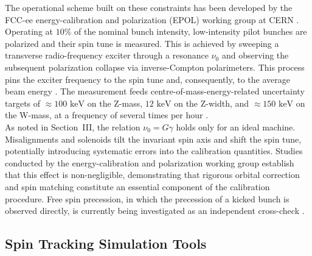 \documentclass[%
 aip,
 amsmath,amssymb,
 reprint,%
superscriptaddress
]{revtex4-2}
\begin{document}
The operational scheme built on these constraints has been developed by the FCC-ee energy-calibration and polarization (EPOL) working group at CERN \cite{blondel_polarization_2019,keintzel_wu_kiel_sagan_wilkinson_oide_bauche_hofle_blondel_jiang_2025,keintzel:ipac2026-mop1037}.
Operating at $10\%$ of the nominal bunch intensity, low-intensity pilot bunches are polarized and their spin tune is measured.
This is achieved by sweeping a transverse radio-frequency exciter through a resonance $\nu_0$ and observing the subsequent polarization collapse via inverse-Compton polarimeters.
This process pins the exciter frequency to the spin tune and, consequently, to the average beam energy \cite{blondel_polarization_2019,keintzel_wu_kiel_sagan_wilkinson_oide_bauche_hofle_blondel_jiang_2025}.
The measurement feeds centre-of-mass-energy-related uncertainty targets of $\approx 100\text{ keV}$ on the Z-mass, $12\text{ keV}$ on the Z-width, and $\approx 150\text{ keV}$ on the W-mass, at a frequency of several times per hour \cite{keintzel_wu_kiel_sagan_wilkinson_oide_bauche_hofle_blondel_jiang_2025,keintzel:ipac2026-mop1037}.
\\
As noted in Section~III, the relation $\nu_0 = G\gamma$ holds only for an ideal machine.
Misalignments and solenoids tilt the invariant spin axis and shift the spin tune, potentially introducing systematic errors into the calibration quantities.
Studies conducted by the energy-calibration and polarization working group establish that this effect is non-negligible, demonstrating that rigorous orbital correction and spin matching constitute an essential component of the calibration procedure.
Free spin precession, in which the precession of a kicked bunch is observed directly, is currently being investigated as an independent cross-check \cite{keintzel:ipac2026-mop1037}.

\subsection{Spin Tracking Simulation Tools}
\end{document}
